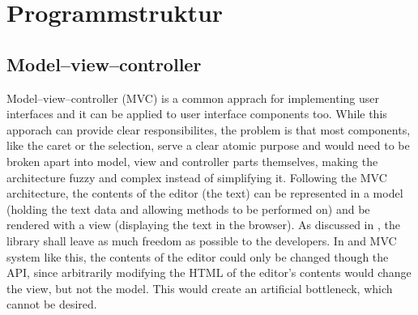 \section{Programmstruktur}



\subsection{Model--view--controller}

Model--view--controller (MVC) is a common apprach for implementing user interfaces and it can be applied to user interface components too. While this apporach can provide clear responsibilites, the problem is that most components, like the caret or the selection, serve a clear atomic purpose and would need to be broken apart into model, view and controller parts themselves, making the architecture fuzzy and complex instead of simplifying it. Following the MVC architecture, the contents of the editor (the text) can be represented in a model (holding the text data and allowing methods to be performed on) and be rendered with a view (displaying the text in the browser). As discussed in , the library shall leave as much freedom as possible to the developers. In and MVC system like this, the contents of the editor could only be changed though the API, since arbitrarily modifying the HTML of the editor's contents would change the view, but not the model. This would create an artificial bottleneck, which cannot be desired.



